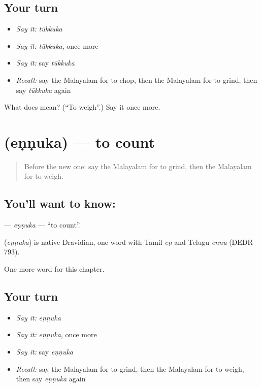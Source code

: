 \subsection*{Your turn}
\begin{itemize}
\raggedright
  \item \emph{Say it:} \emph{tūkkuka}
  \item \emph{Say it:} \emph{tūkkuka}, once more
  \item \emph{Say it:} say \emph{tūkkuka}
  \item \emph{Recall:} say the Malayalam for to chop, then the Malayalam for to grind, then say \emph{tūkkuka} again
\end{itemize}

\begin{tcolorbox}[breakable,colback=teal!4,colframe=teal!35!black,title={Before you move on}]
What does  mean? (\textquotedblleft{}To weigh\textquotedblright{}.) Say it once more.
\end{tcolorbox}
\section[\texorpdfstring{\ml{എണ്ണുക} (eṇṇuka)}{എണ്ണുക (eṇṇuka)}]{ (eṇṇuka) — to count}

\label{lesson:ML-C303-ennuka}



\begin{quote}
Before the new one: say the Malayalam for to grind, then the Malayalam for to weigh.
\end{quote}

\subsection*{You'll want to know: }
\textbf{} — \emph{eṇṇuka} — \textquotedblleft{}to count\textquotedblright{}.

\begin{cousinweb}
\textbf{} (\emph{eṇṇuka}) is native Dravidian, one word with Tamil \emph{eṇ} and Telugu \emph{ennu} (DEDR 793).
\end{cousinweb}

\begin{grammarlens}[title={What you've built}]
One more word for this chapter.
\end{grammarlens}

\subsection*{Your turn}
\begin{itemize}
\raggedright
  \item \emph{Say it:} \emph{eṇṇuka}
  \item \emph{Say it:} \emph{eṇṇuka}, once more
  \item \emph{Say it:} say \emph{eṇṇuka}
  \item \emph{Recall:} say the Malayalam for to grind, then the Malayalam for to weigh, then say \emph{eṇṇuka} again
\end{itemize}


